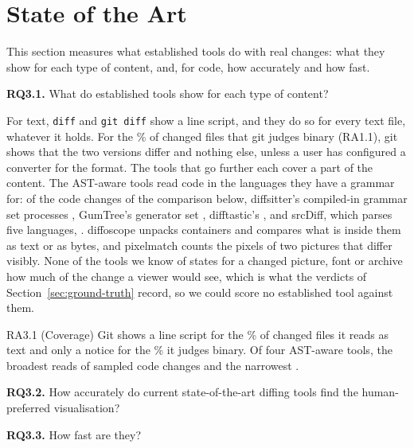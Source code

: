 \documentclass[sigconf,review]{acmart}
\begin{document}
\section{State of the Art}
\label{sec:tools}

This section measures what established tools do with real changes: what they show for each type
of content, and, for code, how accurately and how fast.

\textbf{RQ3.1.} What do established tools show for each type of content?

For text, \texttt{diff} and \texttt{git diff} show a line script, and they do so for every text
file, whatever it holds. For the \ChangeCensusBinaryPct{}\% of changed files that git judges
binary (RA1.1), git shows that the two versions differ and nothing else, unless a user has
configured a converter for the format. The tools that go further each cover a part of the
content. The AST-aware tools read code in the languages they have a grammar for: of the
\UnixDiffFixtures{} code changes of the comparison below, diffsitter's compiled-in grammar set
processes \DiffsitterFixtures{}, GumTree's generator set \GumTreeFixtures{}, difftastic's
\DifftasticFixtures{}, and srcDiff, which parses five languages, \SrcDiffFixtures{}. diffoscope
unpacks containers and compares what is inside them as text or as bytes, and pixelmatch counts
the pixels of two pictures that differ visibly. None of the tools we know of states for a
changed picture, font or archive how much of the change a viewer would see, which is what the
verdicts of Section~\ref{sec:ground-truth} record, so we could score no established tool against
them.

\begin{resultbox}{RA3.1 (Coverage)}
  Git shows a line script for the \ChangeCensusTextPct{}\% of changed files it reads as text and
  only a notice for the \ChangeCensusBinaryPct{}\% it judges binary. Of four AST-aware tools, the
  broadest reads \DifftasticFixtures{} of \UnixDiffFixtures{} sampled code changes and the
  narrowest \SrcDiffFixtures{}.
\end{resultbox}

\textbf{RQ3.2.} How accurately do current state-of-the-art diffing tools find the
human-preferred visualisation?

\textbf{RQ3.3.} How fast are they?
\end{document}
